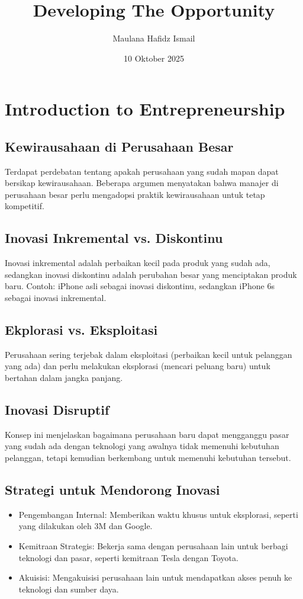 \documentclass{article}
\title{Developing The Opportunity}
\date{10 Oktober 2025}
\author{Maulana Hafidz Ismail}
\begin{document}
\maketitle
\newpage

\tableofcontents
\newpage
{}

\section{Introduction to Entrepreneurship}
\subsection{Kewirausahaan di Perusahaan Besar}
Terdapat perdebatan tentang apakah perusahaan yang sudah mapan dapat bersikap kewirausahaan. Beberapa argumen menyatakan bahwa manajer di perusahaan besar perlu mengadopsi praktik kewirausahaan untuk tetap kompetitif.

\subsection{Inovasi Inkremental vs. Diskontinu}
Inovasi inkremental adalah perbaikan kecil pada produk yang sudah ada, sedangkan inovasi diskontinu adalah perubahan besar yang menciptakan produk baru. Contoh: iPhone asli sebagai inovasi diskontinu, sedangkan iPhone 6s sebagai inovasi inkremental.

\subsection{Ekplorasi vs. Eksploitasi}
Perusahaan sering terjebak dalam eksploitasi  (perbaikan kecil untuk pelanggan yang ada) dan perlu melakukan eksplorasi (mencari peluang baru) untuk bertahan dalam jangka panjang.

\subsection{Inovasi Disruptif}
Konsep ini menjelaskan bagaimana perusahaan baru dapat mengganggu pasar yang sudah ada dengan teknologi yang awalnya tidak memenuhi kebutuhan pelanggan, tetapi kemudian berkembang untuk memenuhi kebutuhan tersebut.

\subsection{Strategi untuk Mendorong Inovasi}
\begin{itemize}
    \item Pengembangan Internal: Memberikan waktu khusus untuk eksplorasi, seperti yang dilakukan oleh 3M dan Google.
    \item Kemitraan Strategis: Bekerja sama dengan perusahaan lain untuk berbagi teknologi dan pasar, seperti kemitraan Tesla dengan Toyota.
    \item Akuisisi: Mengakuisisi perusahaan lain untuk mendapatkan akses penuh ke teknologi dan sumber daya.
\end{itemize}
\end{document}
